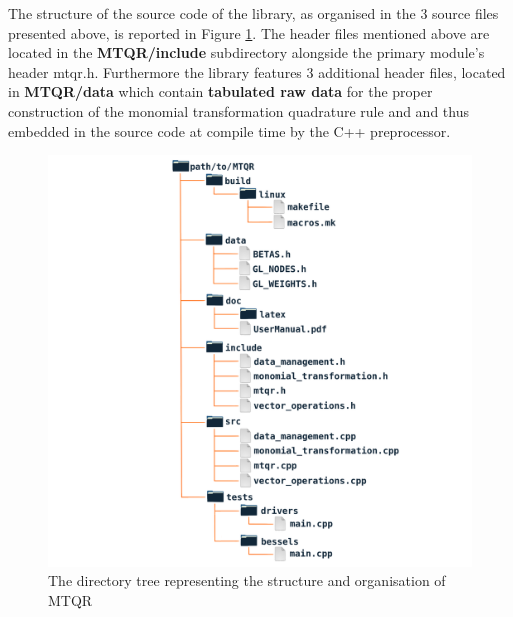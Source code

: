 \documentclass[a4paper, twosided]{book}
\begin{document}
\noindent
The structure of the source code of the library, as organised in the $3$ source files presented above, is reported in Figure \ref{Fig2.1}. The header files mentioned above are located in the \colorbox{poliGrayBlue}{\textbf{MTQR/include}} subdirectory alongside the primary module's header \colorbox{poliGrayBlue}{mtqr.h}. Furthermore the library features $3$ additional header files, located in \colorbox{poliGrayBlue}{\textbf{MTQR/data}} which contain \color{poliDarkBlue} \textbf{tabulated raw data} \color{black} for the proper construction of the monomial transformation quadrature rule and and thus embedded in the source code at compile time by the C++ preprocessor.

\newpage
\begin{center}
        \begin{figure}[H]
        \centering
        \includegraphics[keepaspectratio, width=.6\textwidth]{images/DirectoryStructureCentered.png}
        \caption{The directory tree representing the structure and organisation of MTQR}
        \label{Fig2.1}
        \end{figure}
\end{center}
\end{document}
